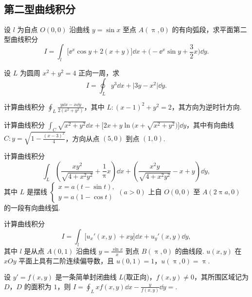\subsection{第二型曲线积分}

	\begin{ti}
		设 $l$ 为自点 $O(0,0)$ 沿曲线 $y = \sin x$ 至点 $A(\uppi,0)$ 的有向弧段，求平面第二型曲线积分
		\[
			I = \int_{l} \bigl[ \ee^{x} \cos y + 2 (x + y) \bigr] \dd{x} + \Biggl( -\ee^{x} \sin y + \frac{3}{2}x \Biggr) \dd{y}.
		\]
	\end{ti}

	\begin{ti}
		设 $L$ 为圆周 $x^{2} + y^{2} = 4$ 正向一周，求
		\[
			I = \oint_{L} y^{3} \dd{x} + \bigl| 3y - x^{2} \bigr| \dd{y}.
		\]
	\end{ti}

	\begin{ti}
		计算曲线积分 $\oint_{L} \frac{y \dd{x} - x \dd{y}}{2\left(x^{2} + y^{2}\right)}$，其中 $L: (x - 1)^{2} + y^{2} = 2$，其方向为逆时针方向.
	\end{ti}

	\begin{ti}
		计算曲线积分 $\int_{C} \sqrt{x^{2} + y^{2}} \dd{x} + \bigl[ 2x + y\ln\bigl( x + \sqrt{x^{2} + y^{2}} \bigr) \bigr] \dd{y}$，其中有向曲线 $C: y = \sqrt{1 - \frac{(x - 3)^{2}}{4}}$，方向从点 $(5,0)$ 到点 $(1,0)$.
	\end{ti}

	\begin{ti}
		计算曲线积分
		\[
			\int_{L} \left( \frac{xy^{2}}{\sqrt{4 + x^{2}y^{2}}} + \frac{1}{\uppi}x \right)\dd{x} + \left( \frac{x^{2}y}{\sqrt{4 + x^{2}y^{2}}} - x + y \right)\dd{y},
		\]
		其中 $L$ 是摆线 $\begin{cases}
			x = a (t - \sin t),\\
			y = a (1 - \cos t)
		\end{cases} (a > 0)$ 上自 $O(0,0)$ 至 $A(2\uppi a,0)$ 的一段有向曲线弧.
	\end{ti}

	\begin{ti}
		计算曲线积分
		\[
			I = \int_{l} \bigl[ u_{x}'(x,y) + xy \bigr] \dd{x} + u_{y}'(x,y) \dd{y},
		\]
		其中 $l$ 是从点 $A(0,1)$ 沿曲线 $y = \frac{\sin x}{x}$ 到点 $B(\uppi,0)$ 的曲线段. $u(x,y)$ 在 $xOy$ 平面上具有二阶连续偏导数，且 $u(0,1) = 1$，$u(\uppi,0) = \uppi$.
	\end{ti}

	\begin{ti}
		设 $y' = f(x,y)$ 是一条简单封闭曲线 $L$(取正向)，$f(x,y) \ne 0$，其所围区域记为 $D$，$D$ 的面积为 $1$，则 $I = \oint_{L} xf(x,y) \dd{x} - \frac{y}{f(x,y)} \dd{y} = $\htwo.
	\end{ti}

